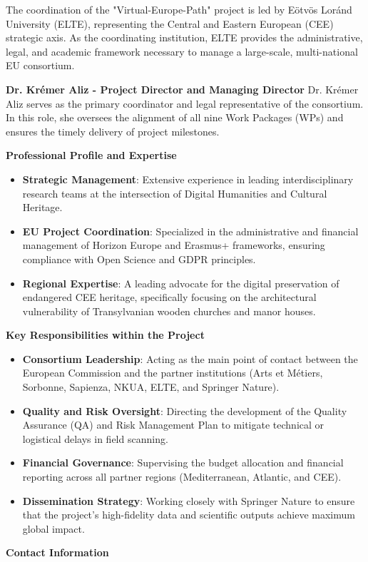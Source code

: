 The coordination of the "Virtual-Europe-Path" project is led by Eötvös Loránd University (ELTE), representing the Central and Eastern European (CEE) strategic axis. As the coordinating institution, ELTE provides the administrative, legal, and academic framework necessary to manage a large-scale, multi-national EU consortium.

\textbf{Dr. Krémer Aliz - Project Director and Managing Director}
Dr. Krémer Aliz serves as the primary coordinator and legal representative of the consortium. In this role, she oversees the alignment of all nine Work Packages (WPs) and ensures the timely delivery of project milestones.

\textbf{Professional Profile and Expertise}
\begin{itemize}
    \item \textbf{Strategic Management}: Extensive experience in leading interdisciplinary research teams at the intersection of Digital Humanities and Cultural Heritage.
    \item \textbf{EU Project Coordination}: Specialized in the administrative and financial management of Horizon Europe and Erasmus+ frameworks, ensuring compliance with Open Science and GDPR principles.
    \item \textbf{Regional Expertise}: A leading advocate for the digital preservation of endangered CEE heritage, specifically focusing on the architectural vulnerability of Transylvanian wooden churches and manor houses.
\end{itemize}

\textbf{Key Responsibilities within the Project}
\begin{itemize}
    \item \textbf{Consortium Leadership}: Acting as the main point of contact between the European Commission and the partner institutions (Arts et Métiers, Sorbonne, Sapienza, NKUA, ELTE, and Springer Nature).
    \item \textbf{Quality and Risk Oversight}: Directing the development of the Quality Assurance (QA) and Risk Management Plan to mitigate technical or logistical delays in field scanning.
    \item \textbf{Financial Governance}: Supervising the budget allocation and financial reporting across all partner regions (Mediterranean, Atlantic, and CEE).
    \item \textbf{Dissemination Strategy}: Working closely with Springer Nature to ensure that the project's high-fidelity data and scientific outputs achieve maximum global impact.
\end{itemize}

\textbf{Contact Information}
